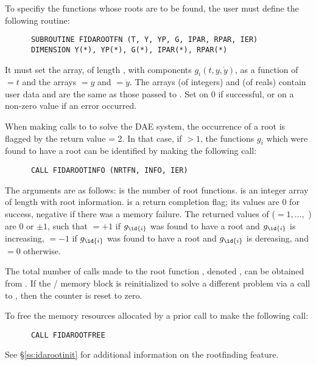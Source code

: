 To specifiy the functions whose roots are to be found, the user must
define the following routine:
\begin{verbatim}
      SUBROUTINE FIDAROOTFN (T, Y, YP, G, IPAR, RPAR, IER)
      DIMENSION Y(*), YP(*), G(*), IPAR(*), RPAR(*)
\end{verbatim}
It must set the  array, of length , with components
$g_i(t,y,\dot{y})$, as a function of  $= t$ and the arrays  $= y$
and  $= \dot{y}$.
The arrays  (of integers) and  (of reals) contain user data
and are the same as those passed to .
Set  on 0 if successful, or on a non-zero value if an error occurred.

When making calls to  to solve the DAE system, the occurrence
of a root is flagged by the return value  = 2.  In that case, if
 $> 1$, the functions $g_i$ which were found to have a root can
be identified by making the following call:
\begin{verbatim}
      CALL FIDAROOTINFO (NRTFN, INFO, IER)
\end{verbatim}
The arguments are as follows:  is the number of root functions.
 is an integer array of length  with root information.
 is a return completion flag; its values are $0$ for success, 
negative if there was a memory failure.  The returned values of 
($ = 1,\ldots,$ ) are $0$ or $\pm 1$, such that 
 $ = +1$ if $g_{\id{i}}$ was found to have a root and $g_{\id{i}}$ is increasing,
 $ = -1$ if $g_{\id{i}}$ was found to have a root and $g_{\id{i}}$ is dereasing,
and  $ = 0$ otherwise.

The total number of calls made to the root function ,
denoted , can be obtained from .
If the {\fida}/{\ida} memory block is reinitialized to solve a
different problem via a call to , then the counter
 is reset to zero.

To free the memory resources allocated by a prior call to  make
the following call:
\begin{verbatim}
      CALL FIDAROOTFREE
\end{verbatim}
See \S\ref{ss:idarootinit} for additional information on the
rootfinding feature.



